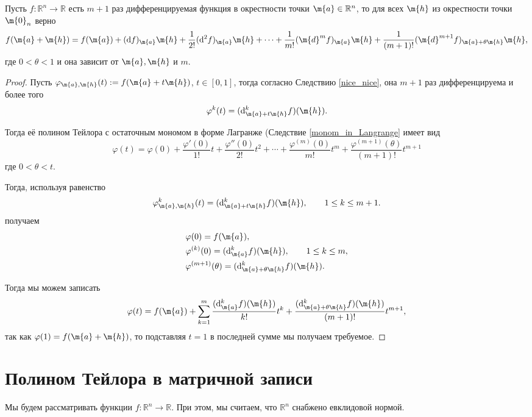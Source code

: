 \begin{theorem}\label{Taylor_in_many}
    Пусть $f:\mathbb{R}^n \to \mathbb{R}$ есть $m+1$ раз дифференцируемая функция в окрестности точки $\m{a} \in \mathbb{R}^n$, то для всех $\m{h}$ из окрестности точки $\m{0}_n$ верно 
    \[
     f(\m{a} + \m{h}) = f(\m{a}) + (\mathrm{d}f)_\m{a} \m{h} + \frac{1}{2!} (\mathrm{d}^2f)_\m{a}\m{h} + \cdots + \frac{1}{m!} (\m{d}^mf)_\m{a}\m{h} + \frac{1}{(m+1)!} (\m{d}^{m+1}f)_{\m{a}+ \theta \m{h}}\m{h},
    \]
    где $0 < \theta < 1$ и она зависит от $\m{a}, \m{h}$ и $m$.
\end{theorem}
\begin{proof}
    Пусть $\varphi_{\m{a},\m{h}}(t): = f(\m{a}+t \m{h})$, $t \in [0,1]$, тогда согласно Следствию \ref{nice_nice}, она $m+1$ раз дифференцируема и более того 
    \[
     \varphi^{k}(t) = (\mathrm{d}^k_{\m{a}+t\m{h}}f)(\m{h}).
    \]

Тогда её полином Тейлора с остаточным мономом в форме Лагранже (Следствие \ref{monom_in_Langrange} имеет вид
\[
 \varphi(t) = \varphi(0) + \frac{\varphi'(0)}{1!}t + \frac{\varphi''(0)}{2!}t^2 + \cdots + \frac{\varphi^{(m)}(0)}{m!}t^m + \frac{\varphi^{(m+1)}(\theta)}{(m+1)!}t^{m+1}
\]
где $0 < \theta < t.$

Тогда, используя равенство 
 \[
     \varphi_{\m{a},\m{h}}^{k}(t) = (\mathrm{d}^k_{\m{a}+t\m{h}}f)(\m{h}), \qquad 1 \le k \le m+1.
    \]
    получаем
\begin{align*}
    &\varphi(0) = f(\m{a}), \\
    &\varphi^{(k)}(0) = (\mathrm{d}^k_{\m{a}}f)(\m{h}), \qquad 1 \le k \le m,\\
    &\varphi^{(m+1)}(\theta) =(\mathrm{d}^k_{\m{a}+\theta \m{h}}f)(\m{h}).
\end{align*}

Тогда мы можем записать
\[
 \varphi(t) = f(\m{a}) + \sum_{k=1}^m \frac{(\mathrm{d}^k_{\m{a}}f)(\m{h})}{k!}t^k + \frac{( \mathrm{d}^k_{\m{a}+\theta \m{h}}f)(\m{h}) }{(m+1)!}t^{m+1},
\]
так как $\varphi(1) = f(\m{a}+\m{h})$, то подставляя $t=1$ в последней сумме мы получаем требуемое.
 \end{proof}




\section{Полином Тейлора в матричной записи }


Мы будем рассматривать функции $f:\mathbb{R}^n \to \mathbb{R}$. При этом, мы считаем, что $\mathbb{R}^n$ снабжено евклидовой нормой.

